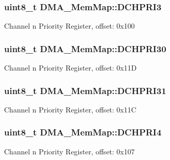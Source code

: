\subsubsection[{D\+C\+H\+P\+R\+I3}]{\setlength{\rightskip}{0pt plus 5cm}uint8\+\_\+t D\+M\+A\+\_\+\+Mem\+Map\+::\+D\+C\+H\+P\+R\+I3}\label{struct_d_m_a___mem_map_ac11b0b7296f6e76f0d69fb0e87ced548}
Channel n Priority Register, offset\+: 0x100 \hypertarget{struct_d_m_a___mem_map_afe8b6945db421c7419c55322aa278565}{}
\subsubsection[{D\+C\+H\+P\+R\+I30}]{\setlength{\rightskip}{0pt plus 5cm}uint8\+\_\+t D\+M\+A\+\_\+\+Mem\+Map\+::\+D\+C\+H\+P\+R\+I30}\label{struct_d_m_a___mem_map_afe8b6945db421c7419c55322aa278565}
Channel n Priority Register, offset\+: 0x11\+D \hypertarget{struct_d_m_a___mem_map_a56a0eb82e4a9a4efbf99c59b6bb61e36}{}
\subsubsection[{D\+C\+H\+P\+R\+I31}]{\setlength{\rightskip}{0pt plus 5cm}uint8\+\_\+t D\+M\+A\+\_\+\+Mem\+Map\+::\+D\+C\+H\+P\+R\+I31}\label{struct_d_m_a___mem_map_a56a0eb82e4a9a4efbf99c59b6bb61e36}
Channel n Priority Register, offset\+: 0x11\+C \hypertarget{struct_d_m_a___mem_map_a029c117ad9e471dc1a34bc9b2f6c66c6}{}
\subsubsection[{D\+C\+H\+P\+R\+I4}]{\setlength{\rightskip}{0pt plus 5cm}uint8\+\_\+t D\+M\+A\+\_\+\+Mem\+Map\+::\+D\+C\+H\+P\+R\+I4}\label{struct_d_m_a___mem_map_a029c117ad9e471dc1a34bc9b2f6c66c6}
Channel n Priority Register, offset\+: 0x107 \hypertarget{struct_d_m_a___mem_map_a4bfc2aa5a849643e32da3612393f5b2b}{}
